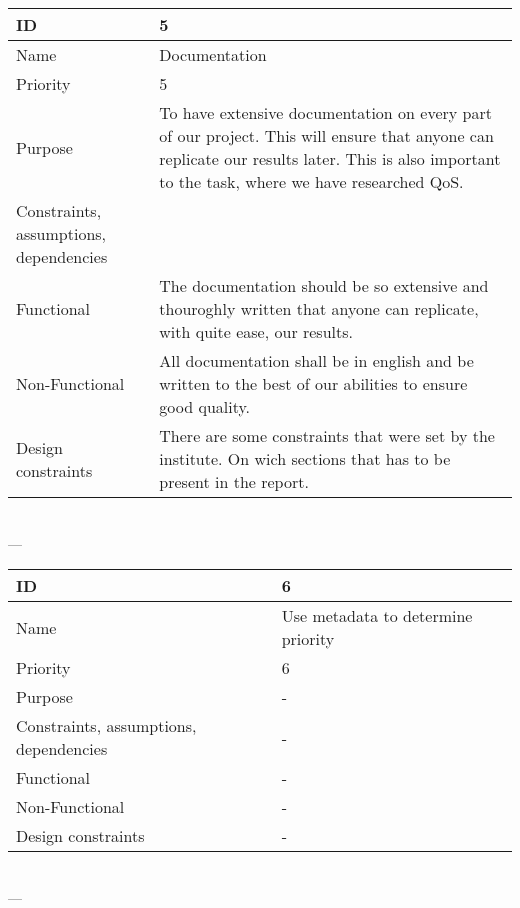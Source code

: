 \begin{center}
    \begin{tabular}{| p{4cm} | p{8cm} |}
        \hline
        ID & 5 \\
        \hline
        Name & Documentation  \\
        \hline
        Priority & 5 \\
        \hline
        Purpose & To have extensive documentation on every part of our project. This will ensure that anyone can replicate our results later. This is also important to the task, where we have researched QoS. \\
        \hline 
        Constraints, assumptions, dependencies &  \\
        \hline  
        Functional & The documentation should be so extensive and thouroghly written that anyone can replicate, with quite ease, our results. \\
        \hline
        Non-Functional & All documentation shall be in english and be written to the best of our abilities to ensure good quality. \\ 
        \hline
        Design constraints & There are some constraints that were set by the institute. On wich sections that has to be present in the report. \\
        \hline
    \end{tabular}
    \\  ---  \\
    
    \begin{tabular}{| p{4cm} | p{8cm} |}
        \hline
        ID & 6 \\
        \hline
        Name & Use metadata to determine priority  \\
        \hline
        Priority & 6 \\
        \hline
        Purpose & - \\
        \hline 
        Constraints, assumptions, dependencies & - \\
        \hline  
        Functional & -\\
        \hline
        Non-Functional & -\\ 
        \hline
        Design constraints & -\\
        \hline
    \end{tabular}
    \\  ---  \\
    

\end{center}
